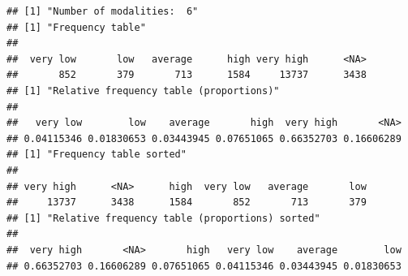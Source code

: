 \begin{verbatim}
## [1] "Number of modalities:  6"
## [1] "Frequency table"
## 
##  very low       low   average      high very high      <NA> 
##       852       379       713      1584     13737      3438 
## [1] "Relative frequency table (proportions)"
## 
##   very low        low    average       high  very high       <NA> 
## 0.04115346 0.01830653 0.03443945 0.07651065 0.66352703 0.16606289 
## [1] "Frequency table sorted"
## 
## very high      <NA>      high  very low   average       low 
##     13737      3438      1584       852       713       379 
## [1] "Relative frequency table (proportions) sorted"
## 
##  very high       <NA>       high   very low    average        low 
## 0.66352703 0.16606289 0.07651065 0.04115346 0.03443945 0.01830653
\end{verbatim}
